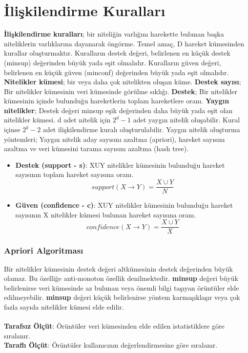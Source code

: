 \section{İlişkilendirme Kuralları}
\textbf{İlişkilendirme kuralları}; bir niteliğin varlığını harekette bulunan başka niteliklerin varlıklarına dayanarak öngörme. Temel amaç, D hareket kümesinden kurallar oluşturmaktır. Kuralların destek değeri, belirlenen en küçük destek (minsup) değerinden büyük yada eşit olmalıdır. Kuralların güven değeri, belirlenen en küçük güven (minconf) değerinden büyük yada eşit olmalıdır. \textbf{Nitelikler kümesi}; bir veya daha çok nitelikten oluşan küme. \textbf{Destek sayısı}; Bir nitelikler kümesinin veri kümesinde görülme sıklığı. \textbf{Destek}; Bir nitelikler kümesinin içinde bulunduğu hareketlerin toplam hareketlere oranı. \textbf{Yaygın nitelikler}; Destek değeri minsup eşik değerinden daha büyük yada eşit olan nitelikler kümesi. d adet nitelik için $2^d-1$ adet yaygın nitelik oluşabilir. Kural içinse $2^k-2$ adet ilişkilendirme kuralı oluşturulabilir. Yaygın nitelik oluşturma yöntemleri; Yaygın nitelik aday sayısını azaltma (apriori), hareket sayısını azaltma ve veri kümesini tarama sayısını azaltma (hash tree).

\begin{itemize}
    \item \textbf{Destek (support - s)}: XUY nitelikler kümesinin bulunduğu hareket sayısının toplam hareket sayısına oranı. \\ \[support(X \rightarrow Y) = \frac{X \cup Y}{N} \]
    \item \textbf{Güven (confidence - c)}: XUY nitelikler kümesinin bulunduğu hareket sayısının X nitelikler kümesi bulunan hareket sayısına oranı. \\ \[confidence(X \rightarrow Y) = \frac{X \cup Y}{X} \]
\end{itemize}

\subsubsection{Apriori Algoritması}
Bir nitelikler kümesinin destek değeri altkümesinin destek değerinden büyük olamaz. Bu özelliğe anti-monoton özellik denilmektedir. \textbf{minsup} değeri büyük belirlenirse veri kümesinde az bulunan veya önemli bilgi taşıyan örüntüler elde edilmeyebilir. \textbf{minsup} değeri küçük belirlenirse yöntem karmaşıklaşır veya çok fazla sayıda nitelikler kümesi elde edilir. \\ \\
\textbf{Tarafsız Ölçüt}: Örüntüler veri kümesinden elde edilen istatistiklere göre sıralanır. \\
\textbf{Taraflı Ölçüt}: Örüntüler kullanıcının değerlendirmesine göre sıralanır. \\

